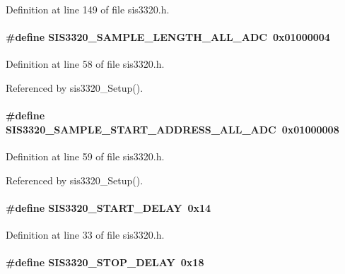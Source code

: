 Definition at line 149 of file sis3320.h.
\paragraph[{SIS3320\_\-SAMPLE\_\-LENGTH\_\-ALL\_\-ADC}]{\setlength{\rightskip}{0pt plus 5cm}\#define SIS3320\_\-SAMPLE\_\-LENGTH\_\-ALL\_\-ADC~0x01000004}\hfill\label{sis3320_8h_a8c88d40604c9c3db4ec33839bc476912}


Definition at line 58 of file sis3320.h.

Referenced by sis3320\_\-Setup().
\paragraph[{SIS3320\_\-SAMPLE\_\-START\_\-ADDRESS\_\-ALL\_\-ADC}]{\setlength{\rightskip}{0pt plus 5cm}\#define SIS3320\_\-SAMPLE\_\-START\_\-ADDRESS\_\-ALL\_\-ADC~0x01000008}\hfill\label{sis3320_8h_a178266f0bfff2bce9ec1a1a36ced8a5c}


Definition at line 59 of file sis3320.h.

Referenced by sis3320\_\-Setup().
\paragraph[{SIS3320\_\-START\_\-DELAY}]{\setlength{\rightskip}{0pt plus 5cm}\#define SIS3320\_\-START\_\-DELAY~0x14}\hfill\label{sis3320_8h_a461f87003f93df742f0a36b4d9dbd2d0}


Definition at line 33 of file sis3320.h.
\paragraph[{SIS3320\_\-STOP\_\-DELAY}]{\setlength{\rightskip}{0pt plus 5cm}\#define SIS3320\_\-STOP\_\-DELAY~0x18}\hfill\label{sis3320_8h_a2d00ff84dbbdb3a62c2142e023be0859}


